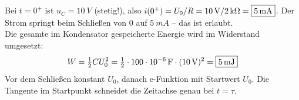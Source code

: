 \documentclass[11pt,a4paper]{article}
\begin{document}
\begin{loesung}
\[\]
Bei $t = 0^+$ ist $u_C = \SI{10}{V}$ (stetig!), also $i(0^+) = U_0/R = \SI{10}{V}/\SI{2}{k\ohm} = \boxed{\SI{5}{mA}}$. Der Strom springt beim Schließen von $0$ auf $\SI{5}{mA}$ -- das ist erlaubt.\\
Die gesamte im Kondensator gespeicherte Energie wird im Widerstand umgesetzt:
\[
  W = \tfrac12 C U_0^2 = \tfrac12\cdot\SI{100e-6}{F}\cdot(\SI{10}{V})^2 = \boxed{\SI{5}{mJ}}
\]
Vor dem Schließen konstant $U_0$, danach e-Funktion mit Startwert $U_0$. Die Tangente im Startpunkt schneidet die Zeitachse genau bei $t = \tau$.
\begin{center}
\end{center}
\end{loesung}
\end{document}
